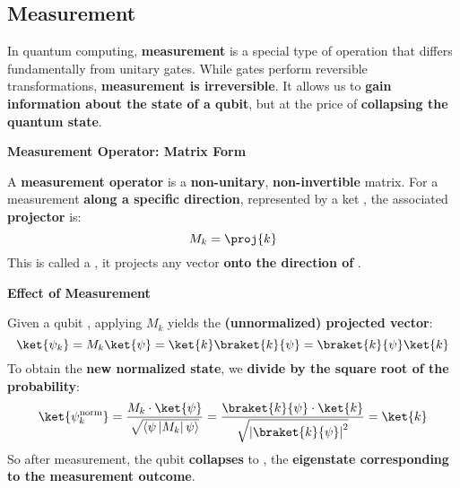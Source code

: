 \subsection{Measurement}

In quantum computing, \textbf{measurement} is a special type of operation that differs fundamentally from unitary gates. While gates perform reversible transformations, \textbf{measurement is irreversible}. It allows us to \textbf{gain information about the state of a qubit}, but at the price of \textbf{collapsing the quantum state}.

\highspace
\begin{flushleft}
  \textcolor{Green3}{ \textbf{Measurement Operator: Matrix Form}}
\end{flushleft}
A \textbf{measurement operator} is a \textbf{non-unitary}, \textbf{non-invertible} matrix. For a measurement \textbf{along a specific direction}, represented by a ket , the associated \textbf{projector} is:
\begin{equation}
  M_{k} = \proj{k}
\end{equation}
This is called a , it projects any vector \textbf{onto the direction of} .

\highspace
\begin{flushleft}
  \textcolor{Red2}{ \textbf{Effect of Measurement}}
\end{flushleft}
Given a qubit \ket{\psi}, applying $M_{k}$ yields the \textbf{(unnormalized) projected vector}:
\begin{equation*}
  \ket{\psi_{k}} = M_{k} \ket{\psi} = \ket{k} \braket{k}{\psi} = \braket{k}{\psi} \ket{k}
\end{equation*}
To obtain the \textbf{new normalized state}, we \textbf{divide by the square root of the probability}:
\begin{equation*}
  \ket{\psi_{k}^{\text{norm}}} =
  \dfrac{M_{k} \cdot \ket{\psi}}{\sqrt{\left\langle \psi \left| M_{k} \right| \psi \right\rangle}} =
  \dfrac{\braket{k}{\psi} \cdot \ket{k}}{\sqrt{\left|\braket{k}{\psi}\right|^{2}}} =
  \ket{k}
\end{equation*}
So after measurement, the qubit \textbf{collapses} to , the \textbf{eigenstate corresponding to the measurement outcome}.

